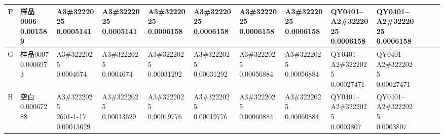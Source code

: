\documentclass[UTF8,10pt,a4paper,fontset=fandol]{ctexart}
\begin{document}
\begin{center}
\begin{tabular}{c|*{12}{p{0.55cm}|}}
F &
\shortstack{样品0006\\0.001589} &
\shortstack{A3\#3222025\\0.0005141} &
\shortstack{A3\#3222025\\0.0005141} &
\shortstack{A3\#3222025\\0.0006158} &
\shortstack{A3\#3222025\\0.0006158} &
\shortstack{A3\#3222025\\0.0006158} &
\shortstack{A3\#3222025\\0.0006158} &
\shortstack{QY0401--\\A2\#3222025\\0.0006158} &
\shortstack{QY0401--\\A2\#3222025\\0.0006158} &
 &
 &
\\ \hline
G &
\shortstack{样品0007\\0.0006973} &
\shortstack{A3\#3222025\\0.0004674} &
\shortstack{A3\#3222025\\0.0004674} &
\shortstack{A3\#3222025\\0.00031292} &
\shortstack{A3\#3222025\\0.00031292} &
\shortstack{A3\#3222025\\0.00056884} &
\shortstack{A3\#3222025\\0.00056884} &
\shortstack{QY0401--\\A2\#3222025\\0.00027471} &
\shortstack{QY0401--\\A2\#3222025\\0.00027471} &
 &
 &
\\ \hline
H &
\shortstack{空白\\0.00067288} &
\shortstack{A3\#3222025\\2601-1-17\\0.00013629} &
\shortstack{A3\#3222025\\0.00013629} &
\shortstack{A3\#3222025\\0.00019776} &
\shortstack{A3\#3222025\\0.00019776} &
\shortstack{A3\#3222025\\0.00060884} &
\shortstack{A3\#3222025\\0.00060884} &
\shortstack{QY0401--\\A2\#3222025\\0.0003807} &
\shortstack{QY0401--\\A2\#3222025\\0.0003807} &
 &
 &
\\ \hline
\end{tabular}
\end{center}
\end{document}

